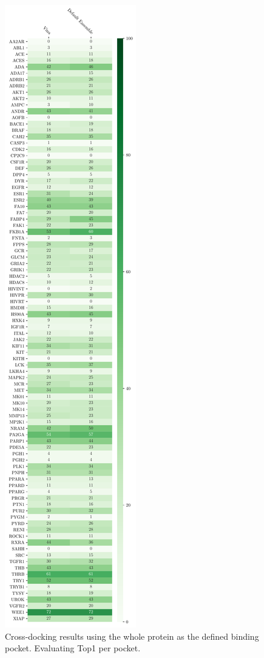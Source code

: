 \documentclass[journal=jcisd8,manuscript=article]{achemso}
\begin{document}
\begin{figure}
    \centering
    \includegraphics[height=0.9\textheight]{figures/crossdocking/whole_ptn_top1_per_pocket.pdf}
    \caption{Cross-docking results using the whole protein as the defined binding pocket. Evaluating Top1 per pocket.}
    \label{fig:WholeProtein_PerPock}
\end{figure}
\end{document}
